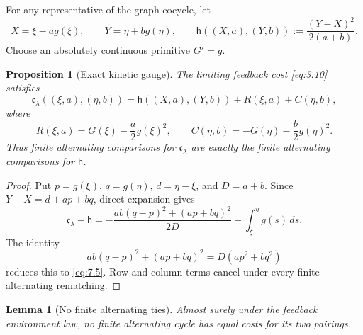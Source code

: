 \documentclass[11pt,reqno]{amsart}
\newtheorem{lemma}[theorem]{Lemma}
\newtheorem{proposition}[theorem]{Proposition}
\theoremstyle{definition}
\theoremstyle{remark}
\numberwithin{equation}{section}
\begin{document}
For any representative of the graph cocycle, let
\begin{equation}
X=\xi-a g(\xi),\qquad Y=\eta+b g(\eta),
\qquad
\mathsf h((X,a),(Y,b)):=\frac{(Y-X)^2}{2(a+b)}.
\label{eq:7.3}
\end{equation}
Choose an absolutely continuous primitive \(G' = g\).

\begin{proposition}[Exact kinetic gauge]
\label{prop:kinetic-gauge}
The limiting feedback cost \eqref{eq:3.10} satisfies
\begin{equation}
\boxed{
\mathfrak c_\lambda((\xi,a),(\eta,b))
=\mathsf h((X,a),(Y,b))+R(\xi,a)+C(\eta,b),}
\label{eq:7.4}
\end{equation}
where
\begin{equation}
R(\xi,a)=G(\xi)-\frac a2g(\xi)^2,
\qquad
C(\eta,b)=-G(\eta)-\frac b2g(\eta)^2.
\label{eq:7.5}
\end{equation}
Thus finite alternating comparisons for \(\mathfrak c_\lambda\) are
exactly the finite alternating comparisons for \(\mathsf h\).
\end{proposition}

\begin{proof}
Put \(p=g(\xi)\), \(q=g(\eta)\), \(d=\eta-\xi\), and
\(D=a+b\).  Since \(Y-X=d+ap+bq\), direct expansion gives
\[
\mathfrak c_\lambda-\mathsf h
=-\frac{ab(q-p)^2+(ap+bq)^2}{2D}
-\int_\xi^\eta g(s)\,ds.
\]
The identity
\[
ab(q-p)^2+(ap+bq)^2=D(ap^2+bq^2)
\]
reduces this to \eqref{eq:7.5}.  Row and column terms cancel under every finite
alternating rematching.
\end{proof}

\begin{lemma}[No finite alternating ties]
\label{lem:no-finite-alternating-ties}
Almost surely under the feedback environment law, no finite alternating
cycle has equal costs for its two pairings.
\end{lemma}
\end{document}
